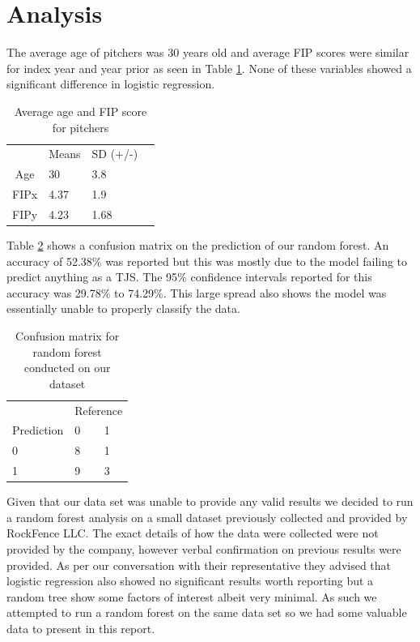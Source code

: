 \section{Analysis}

The average age of pitchers was 30 years old and average FIP scores were similar for index year and year prior as seen in Table \ref{tbl:desc-stats}. None of these variables showed a significant difference in logistic regression.

\begin{table}[h]
\centering
\caption{Average age and FIP score for pitchers}
\label{tbl:desc-stats}
\begin{tabular}{clll}
     & Means & SD (+/-)  \\
Age  & 30    & 3.8  \\
FIPx & 4.37  & 1.9  \\
FIPy & 4.23  & 1.68
\end{tabular}
\end{table}

Table \ref{tbl:conf-matrix} shows a confusion matrix on the prediction of our random forest. An accuracy of 52.38\% was reported but this was mostly due to the model failing to predict anything as a TJS. The 95\% confidence intervals reported for this accuracy was 29.78\% to 74.29\%. This large spread also shows the model was essentially unable to properly classify the data.

\begin{table}[h]
\centering
\caption{Confusion matrix for random forest conducted on our dataset}
\label{tbl:conf-matrix}
\begin{tabular}{lll}
           & \multicolumn{2}{l}{Reference} \\
Prediction & 0             & 1             \\
0          & 8             & 1             \\
1          & 9             & 3
\end{tabular}
\end{table}

Given that our data set was unable to provide any valid results we decided to run a random forest analysis on a small dataset previously collected and provided by RockFence LLC. The exact details of how the data were collected were not provided by the company, however verbal confirmation on previous results were provided. As per our conversation with their representative they advised that logistic regression also showed no significant results worth reporting but a random tree show some factors of interest albeit very minimal. As such we attempted to run a random forest on the same data set so we had some valuable data to present in this report.


